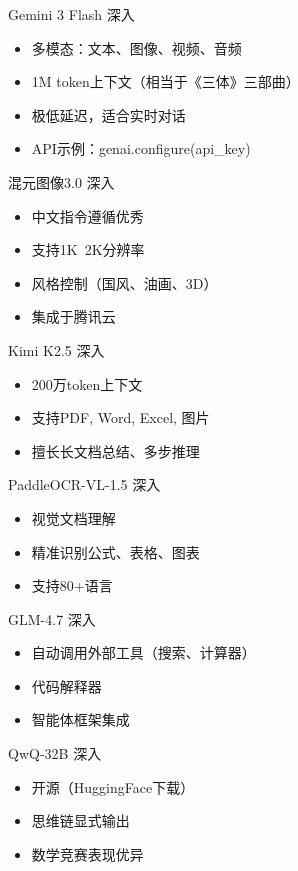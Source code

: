 \begin{frame}{Gemini 3 Flash 深入}
\begin{itemize}
\item 多模态：文本、图像、视频、音频
\item 1M token上下文（相当于《三体》三部曲）
\item 极低延迟，适合实时对话
\item API示例：genai.configure(api_key)
\end{itemize}
\end{frame}
\begin{frame}{混元图像3.0 深入}
\begin{itemize}
\item 中文指令遵循优秀
\item 支持1K~2K分辨率
\item 风格控制（国风、油画、3D）
\item 集成于腾讯云
\end{itemize}
\end{frame}
\begin{frame}{Kimi K2.5 深入}
\begin{itemize}
\item 200万token上下文
\item 支持PDF, Word, Excel, 图片
\item 擅长长文档总结、多步推理
\end{itemize}
\end{frame}
\begin{frame}{PaddleOCR-VL-1.5 深入}
\begin{itemize}
\item 视觉文档理解
\item 精准识别公式、表格、图表
\item 支持80+语言
\end{itemize}
\end{frame}
\begin{frame}{GLM-4.7 深入}
\begin{itemize}
\item 自动调用外部工具（搜索、计算器）
\item 代码解释器
\item 智能体框架集成
\end{itemize}
\end{frame}
\begin{frame}{QwQ-32B 深入}
\begin{itemize}
\item 开源（HuggingFace下载）
\item 思维链显式输出
\item 数学竞赛表现优异
\end{itemize}
\end{frame}
